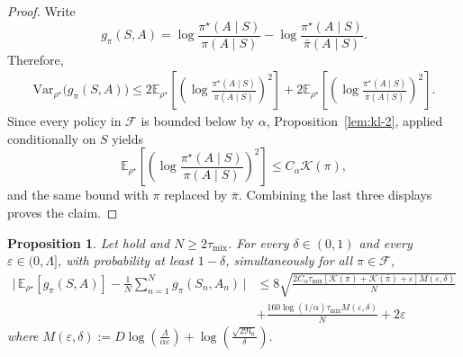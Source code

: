 \documentclass{article}
\newtheorem{proposition}{Proposition}[section]
\theoremstyle{definition}
\theoremstyle{remark}
\theoremstyle{plain}
\newcommand{\E}{\mathbb{E}}
\newcommand{\Var}{\mathrm{Var}}
\numberwithin{equation}{section}
\begin{document}
\begin{proof}
Write
\[
    g_\pi(S,A)
    =
    \log\frac{\pi^\star(A\mid S)}{\pi(A\mid S)}
    -
    \log\frac{\pi^\star(A\mid S)}{\bar\pi(A\mid S)}.
\]
Therefore,
\begin{align*}
    \Var_{\rho^\star}\bigl(g_\pi(S,A)\bigr)
\leq
    2\E_{\rho^\star}
    \left[
        \left(
            \log\frac{\pi^\star(A\mid S)}{\pi(A\mid S)}
        \right)^2
    \right]
    +
    2\E_{\rho^\star}
    \left[
        \left(
            \log\frac{\pi^\star(A\mid S)}{\bar\pi(A\mid S)}
        \right)^2
    \right].
\end{align*}
Since every policy in \(\mathcal F\) is bounded below by \(\alpha\),
Proposition~\ref{lem:kl-2}, applied conditionally on \(S\) yields
\[
    \E_{\rho^\star}
    \left[
        \left(
            \log\frac{\pi^\star(A\mid S)}{\pi(A\mid S)}
        \right)^2
    \right]
    \leq
    C_\alpha\mathcal K(\pi),
\]
and the same bound with \(\pi\) replaced by \(\bar\pi\). Combining the
last three displays proves the claim.
\end{proof}






\begin{proposition}
\label{prop:uniform-likelihood-deviation}
Let  hold and \(N\geq2\tau_{\mathrm{mix}}\). For every
\(\delta\in(0,1)\) and every \(\varepsilon\in(0,\Lambda]\), with
probability at least \(1-\delta\), simultaneously for all
\(\pi\in\mathcal F\),
\begin{align}
\label{eq:uniform-likelihood-deviation}
    \Big|\,
        \E_{\rho^\star}[g_\pi(S,A)]
        -
        \frac1N\sum_{n=1}^N g_\pi(S_n,A_n)
    \,\Big|
    &\leq
     8
    \sqrt{
        \frac{
            2C_\alpha\tau_{\mathrm{mix}}
            \left[
                \mathcal K(\pi)
                +
                \mathcal K(\bar\pi)
                +
                \varepsilon
            \right]
            M(\varepsilon,\delta)
        }{N}
    }\nonumber\\
    &+\frac{
        160\log(1/\alpha)\tau_{\mathrm{mix}}
        M(\varepsilon,\delta)
    }{N}
    +
    2\varepsilon  
\end{align}
where
\(
    M(\varepsilon,\delta)
    :=
    D\log\left(
        \frac{\Lambda}{\alpha\varepsilon}
    \right)
    +
    \log\left(\frac{\sqrt{2\mathfrak N_0}}{\delta}\right).
\)
\end{proposition}
\end{document}
